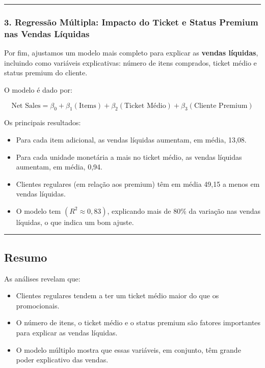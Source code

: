 \documentclass[
]{article}
\providecommand{\tightlist}{%
  \setlength{\itemsep}{0pt}\setlength{\parskip}{0pt}}
\begin{document}
\begin{center}\rule{0.5\linewidth}{0.5pt}\end{center}

\subsubsection{3. Regressão Múltipla: Impacto do Ticket e Status Premium
nas Vendas
Líquidas}\label{regressuxe3o-muxfaltipla-impacto-do-ticket-e-status-premium-nas-vendas-luxedquidas}

Por fim, ajustamos um modelo mais completo para explicar as
\textbf{vendas líquidas}, incluindo como variáveis explicativas: número
de itens comprados, ticket médio e status premium do cliente.

O modelo é dado por:

\[
\text{Net Sales} = \beta_0 + \beta_1 (\text{Items}) + \beta_2 (\text{Ticket Médio}) + \beta_3 (\text{Cliente Premium})
\]

Os principais resultados:

\begin{itemize}
\tightlist
\item
  Para cada item adicional, as vendas líquidas aumentam, em média,
  13,08.
\item
  Para cada unidade monetária a mais no ticket médio, as vendas líquidas
  aumentam, em média, 0,94.
\item
  Clientes regulares (em relação aos premium) têm em média 49,15 a menos
  em vendas líquidas.
\item
  O modelo tem \((R^2 ≈ 0,83)\), explicando mais de 80\% da variação nas
  vendas líquidas, o que indica um bom ajuste.
\end{itemize}

\begin{center}\rule{0.5\linewidth}{0.5pt}\end{center}

\subsection{Resumo}\label{resumo}

As análises revelam que:

\begin{itemize}
\tightlist
\item
  Clientes regulares tendem a ter um ticket médio maior do que os
  promocionais.
\item
  O número de itens, o ticket médio e o status premium são fatores
  importantes para explicar as vendas líquidas.
\item
  O modelo múltiplo mostra que essas variáveis, em conjunto, têm grande
  poder explicativo das vendas.
\end{itemize}
\end{document}
